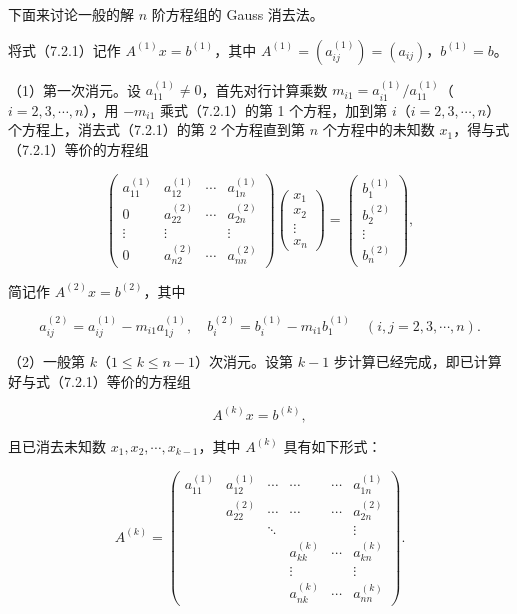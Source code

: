 \documentclass[
  10pt,
  fontset=fandol]{ctexart}
\begin{document}
下面来讨论一般的解 \(n\) 阶方程组的 Gauss 消去法。

将式（7.2.1）记作 \(A^{(1)}x=b^{(1)}\)，其中 \(A^{(1)}=(a_{ij}^{(1)})=(a_{ij})\)，\(b^{(1)}=b\)。

（1）第一次消元。设 \(a_{11}^{(1)}\ne0\)，首先对行计算乘数 \(m_{i1}=a_{i1}^{(1)}/a_{11}^{(1)}\)（\(i=2,3,\cdots,n\)），用 \(-m_{i1}\) 乘式（7.2.1）的第 1 个方程，加到第 \(i\)（\(i=2,3,\cdots,n\)）个方程上，消去式（7.2.1）的第 2 个方程直到第 \(n\) 个方程中的未知数 \(x_1\)，得与式（7.2.1）等价的方程组

\[
\begin{pmatrix}
a_{11}^{(1)}&a_{12}^{(1)}&\cdots&a_{1n}^{(1)}\\
0&a_{22}^{(2)}&\cdots&a_{2n}^{(2)}\\
\vdots&\vdots&&\vdots\\
0&a_{n2}^{(2)}&\cdots&a_{nn}^{(2)}
\end{pmatrix}
\begin{pmatrix}x_1\\x_2\\\vdots\\x_n\end{pmatrix}
=\begin{pmatrix}b_1^{(1)}\\b_2^{(2)}\\\vdots\\b_n^{(2)}\end{pmatrix},
\tag{7.2.7}
\]

简记作 \(A^{(2)}x=b^{(2)}\)，其中

\[
a_{ij}^{(2)}=a_{ij}^{(1)}-m_{i1}a_{1j}^{(1)},\quad
b_i^{(2)}=b_i^{(1)}-m_{i1}b_1^{(1)}\quad(i,j=2,3,\cdots,n).
\]

（2）一般第 \(k\)（\(1\le k\le n-1\)）次消元。设第 \(k-1\) 步计算已经完成，即已计算好与式（7.2.1）等价的方程组

\[A^{(k)}x=b^{(k)},\tag{7.2.8}\]

且已消去未知数 \(x_1,x_2,\cdots,x_{k-1}\)，其中 \(A^{(k)}\) 具有如下形式：

\[
A^{(k)}=\begin{pmatrix}
a_{11}^{(1)}&a_{12}^{(1)}&\cdots&\cdots&\cdots&a_{1n}^{(1)}\\
&a_{22}^{(2)}&\cdots&\cdots&\cdots&a_{2n}^{(2)}\\
&&\ddots&&&\vdots\\
&&&a_{kk}^{(k)}&\cdots&a_{kn}^{(k)}\\
&&&\vdots&&\vdots\\
&&&a_{nk}^{(k)}&\cdots&a_{nn}^{(k)}
\end{pmatrix}.
\]
\end{document}
